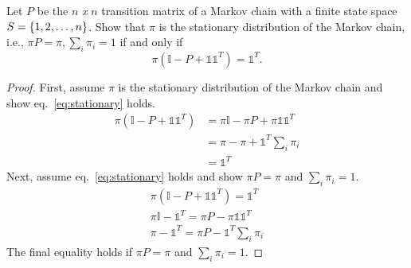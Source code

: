 \documentclass{article}
\newcommand{\one}[0]{\ensuremath{\mathds{1}}}
\newcommand{\I}[0]{\ensuremath{\mathbb{I}}}
\begin{document}
    \begin{problem}
        Let $P$ be the $n$ \emph{x} $n$ transition matrix of a Markov chain with a finite state space $S = \{1, 2, \ldots, n\}$. Show that $\pi$ is the stationary distribution of the Markov chain, i.e., $\pi P = \pi, \sum_i \pi_i = 1$ if and only if
        \begin{equation}
            \pi(\I - P + \one\one^T) = \one^T.
            \label{eq:stationary}
        \end{equation}
    \end{problem}
    \begin{solution}
        \begin{proof}
            First, assume $\pi$ is the stationary distribution of the Markov chain and show eq.~\ref{eq:stationary} holds.
            \begin{align*}
                \pi(\I - P + \one\one^T) &= \pi\I - \pi P + \pi\one\one^T \\
                &= \pi - \pi + \one^T \textstyle\sum_i \pi_i \\
                &= \one^T
            \end{align*}
            Next, assume eq.~\ref{eq:stationary} holds and show $\pi P = \pi$ and $\sum_i \pi_i = 1$.
            \begin{gather*}
                \pi(\I - P + \one\one^T) = \one^T \\
                \pi\I - \one^T = \pi P - \pi\one\one^T \\
                \pi - \one^T = \pi P - \one^T \textstyle\sum_i \pi_i
            \end{gather*}
            The final equality holds if $\pi P = \pi$ and $\sum_i \pi_i = 1$.
        \end{proof}
    \end{solution}
\end{document}
